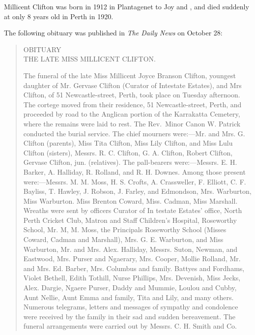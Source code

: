 
Millicent Clifton was born in 1912 in Plantagenet\cite{MJBCbirth} to Joy and , and died suddenly at only 8 years old in Perth in 1920.\cite{MJBCdeath}

The following obituary was published in \emph{The Daily News} on October 28:\cite{MJBCobit}

\begin{quotation}
\begin{center}
OBITUARY \\
THE LATE MISS MILLICENT CLIFTON.
\end{center}

The funeral of the late Miss Millicent Joyce Branson Clifton, youngest daughter of Mr. Gervase Clifton (Curator of Intestate Estates), and Mrs Clifton, of 51 Newcastle-street, Perth, took place on Tuesday afternoon. The cortege moved from their residence, 51 Newcastle-street, Perth, and proceeded by road to the Anglican portion of the Karrakatta Cemetery, where the remains were laid to rest. The Rev.\ Minor Canon W. Patrick conducted the burial service. The chief mourners were:---Mr. and Mrs. G. Clifton (parents), Miss Tita Clifton, Miss Lily Clifton, and Miss Lulu Clifton (sisters), Messrs. R. C. Clifton, G. A. Clifton, Robert Clifton, Gervase Clifton, jun. (relatives). The pall-bearers were:---Messrs. E. H. Barker, A. Halliday, R. Rolland, and R. H. Downes. Among those present were:---Messrs. M. M. Moss, H. S. Crofts, A. Crassweller, F. Elliott, C. F. Bayliss, T. Hawley, J. Robson, J. Farley, and Edmondson, Mrs. Warburton, Miss Warburton. Miss Brenton Coward, Miss. Cadman, Miss Marshall. Wreaths were sent by officers Curator of In testate Estates' office, North Perth Cricket Club, Matron and Staff Children's Hospital, Roseworthy School, Mr. M, M. Moss, the Principals Roseworthy School (Misses Coward, Cadman and Marshall), Mrs. G. E. Warburton, and Miss Warburton, Mr. and Mrs. Alex. Halliday, Messrs. Suton, Newman, and Eastwood, Mrs. Purser and Ngaerary, Mrs. Cooper, Mollie Rolland, Mr. and Mrs. Ed. Barber, Mrs. Columbus and family. Battyes and Fordhams, Violet Bethell, Edith Tothill, Nurse Phillips, Mrs. Devenish, Miss Jecks, Alex. Dargie, Ngaere Purser, Daddy and Mummie, Loulou and Cubby, Aunt Nellie, Aunt Emma and family, Tita and Lily, and many others. Numerous telegrams, letters and messages of sympathy and condolence were received by the family in their sad and sudden bereavement. The funeral arrangements were carried out by Messrs. C. H. Smith and Co.
\end{quotation}
